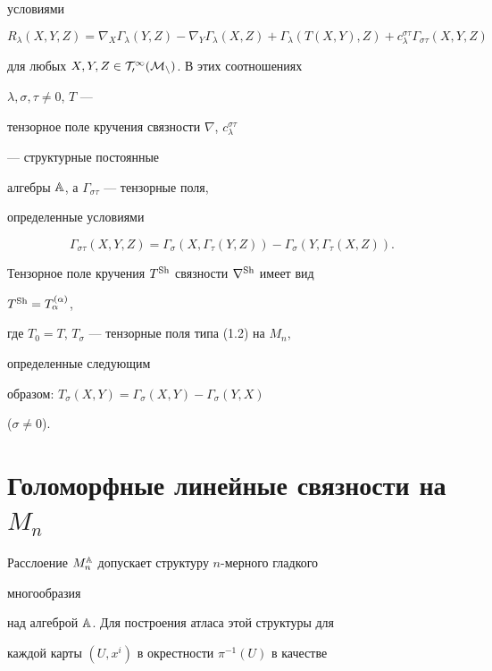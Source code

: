 условиями 


$$ 


R_\lambda(X,Y,Z)=\nabla_X\Gamma_\lambda(Y,Z)- 


\nabla_Y\Gamma_\lambda(X,Z)+\Gamma_\lambda(T(X,Y),Z)+ 


c^{\sigma\tau}_\lambda\Gamma_{\sigma\tau}(X,Y,Z) 


$$ 


для любых $X,Y,Z\in\cal T^1_0(M_n)$. В этих соотношениях 


$\lambda,\sigma,\tau\ne 0$, $T$ --- 


тензорное поле кручения связности $\nabla$, $c^{\sigma\tau}_\lambda$ 


--- структурные постоянные  


алгебры $\Bbb A$, а $\Gamma_{\sigma\tau}$ --- тензорные поля, 


определенные условиями 


$$ 


\Gamma_{\sigma\tau}(X,Y,Z)=\Gamma_\sigma 


(X,\Gamma_\tau(Y,Z))-\Gamma_\sigma(Y,\Gamma_\tau(X,Z)). 


$$ 


 


Тензорное поле кручения $T^{\operatorname{Sh}}$ связности $\nabla^{\operatorname{Sh}}$ имеет вид 


$T^{\operatorname{Sh}}=T^{(\alpha)}_\alpha$, 


где $T_0=T$, $T_\sigma$ --- тензорные поля типа (1.2) на $M_n$, 


определенные следующим 


образом: $T_\sigma(X,Y)=\Gamma_\sigma(X,Y)-\Gamma_\sigma(Y,X)$ 


($\sigma\ne 0$). 


 


\section{Голоморфные линейные связности на $M_n$} 


 


Расслоение $M^{\Bbb A}_n$ допускает структуру $n$-мерного гладкого 


многообразия 


над алгеброй $\Bbb A$. Для построения атласа этой структуры для  


каждой карты $(U,x^i)$ в окрестности $\pi^{-1}(U)$ в качестве 


